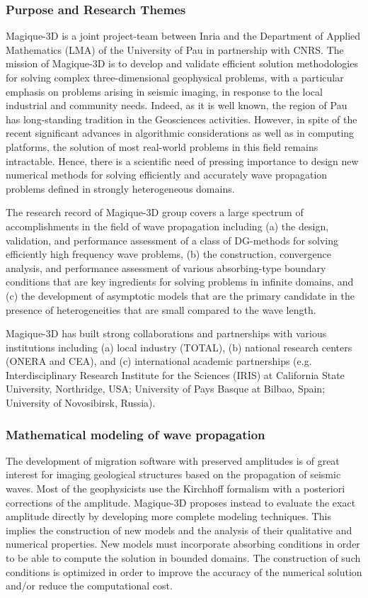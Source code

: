 \subsubsection{Purpose and Research Themes}
    Magique-3D is a joint project-team between Inria and the Department of Applied Mathematics (LMA) of the University of Pau in partnership with CNRS. The mission of Magique-3D is to develop and validate efficient solution methodologies for solving complex three-dimensional geophysical problems, with a particular emphasis on problems arising in seismic imaging, in response to the local industrial and community needs. Indeed, as it is well known, the region of Pau has long-standing tradition in the Geosciences activities. However, in spite of the recent significant advances in algorithmic considerations as well as in computing platforms, the solution of most real-world problems in this field remains intractable. Hence, there is a scientific need of pressing importance to design new numerical methods for solving efficiently and accurately wave propagation problems defined in strongly heterogeneous domains.


The research record of Magique-3D group covers a large spectrum of accomplishments in the field of wave propagation including (a) the design, validation, and performance assessment of a class of DG-methods for solving efficiently high frequency wave problems, (b) the construction, convergence analysis, and performance assessment of various absorbing-type boundary conditions that are key ingredients for solving problems in infinite domains, and (c) the development of asymptotic models that are the primary candidate in the presence of heterogeneities that are small compared to the wave length.

    Magique-3D has built strong collaborations and partnerships with various institutions including (a) local industry (TOTAL), (b) national research centers (ONERA and CEA), and (c) international academic partnerships (e.g. Interdisciplinary Research Institute for the Sciences (IRIS) at California State University, Northridge, USA; University of Pays Basque at Bilbao, Spain; University of Novosibirsk, Russia).

\subsubsection{Mathematical modeling of wave propagation}

    The development of migration software with preserved amplitudes is of great interest for imaging geological structures based on the propagation of seismic waves. Most of the geophysicists use the Kirchhoff formalism with a posteriori corrections of the amplitude. Magique-3D proposes instead to evaluate the exact amplitude directly by developing more complete modeling techniques. This implies the construction of new models and the analysis of their qualitative and numerical properties. New models must incorporate absorbing conditions in order to be able to compute the solution in bounded domains. The construction of such conditions is optimized in order to improve the accuracy of the numerical solution and/or reduce the computational cost.
    

